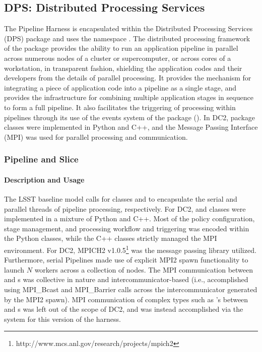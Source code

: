 
\subsection{DPS: Distributed Processing Services}
\label{DPS}\label{sMw-har}

The Pipeline Harness is encapsulated within the Distributed Processing Services (DPS) package
and uses the namespace .  
The distributed processing framework of the  package provides the ability to run an application 
pipeline in parallel across numerous nodes of a cluster or supercomputer, or
across cores of a workstation, 
in transparent fashion, shielding the application codes and their developers from the details
of parallel processing.  It provides the mechanism for integrating a piece of application code 
into  a pipeline as a single stage, and provides the infrastructure for combining multiple 
application stages in sequence to form a full pipeline. It also facilitates the  triggering of 
processing within pipelines through its use of the events system of the  package
().  
In DC2,  
package classes were implemented in Python and C++, and the Message Passing Interface
(MPI) was used for parallel processing and communication. 


\subsubsection{Pipeline and Slice}

\paragraph{Description and Usage}

The LSST baseline model calls for classes  and  to encapsulate the serial and parallel 
threads of pipeline processing, respectively.  For DC2,  and  classes were implemented
in a mixture of Python and C++.  Most of the policy configuration, stage management,  and processing workflow 
and triggering was encoded within the Python classes, while the C++ classes strictly managed 
the MPI environment.  For DC2,  MPICH2 v1.0.5\footnote{http://www.mcs.anl.gov/research/projects/mpich2}
was the message passing library utilized.  
Furthermore, serial Pipelines made use of explicit MPI2 spawn functionality to launch $N$  
workers across a collection of nodes.   The MPI communication between  and s was 
collective in nature and intercommunicator-based (i.e., accomplished using MPI\_Bcast 
and MPI\_Barrier calls across the intercommunicator generated by the MPI2 spawn). 
MPI communication of complex types such as 's between  and s 
was left out of the scope of DC2, and was instead accomplished via the  system for 
this version of the harness. 


